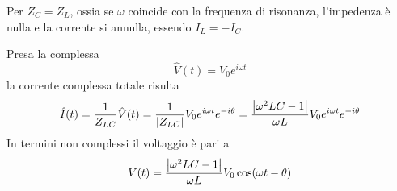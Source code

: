 \begin{observe}
	Per $Z_C=Z_L$, ossia se $\omega$ coincide con la frequenza di risonanza, l'impedenza è nulla e la corrente si annulla, essendo $I_L=-I_C$.
\end{observe}
Presa la \ddp complessa
\begin{equation*}
	\hat{V}(t)=V_0e^{i\omega t}
\end{equation*}
la corrente complessa totale risulta
\begin{equation*}
	\hat{I}(t)=\frac{1}{Z_{LC}}\hat{V}(t)=\frac{1}{\abs{Z_{LC}}}V_0e^{i\omega t}e^{-i\theta}=\frac{\abs{\omega^2 L C - 1}}{\omega L}V_0e^{i\omega t}e^{-i\theta}
\end{equation*}
In termini non complessi il voltaggio è pari a
\begin{equation*}
	V(t)=\frac{\abs{\omega^2 L C - 1}}{\omega L}V_0\cos(\omega t -\theta)
\end{equation*}
